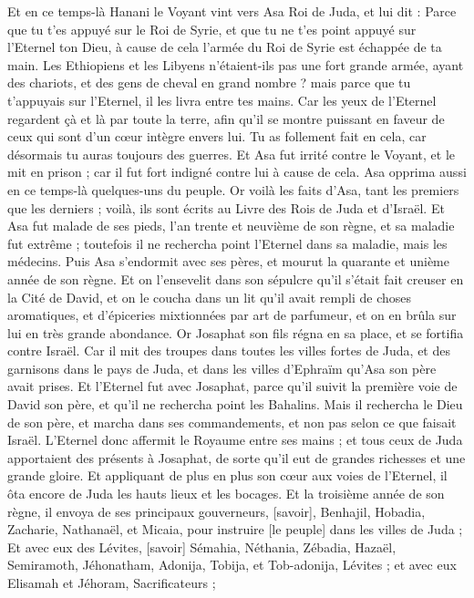 \begin{multicols}{2}
Et en ce temps-là Hanani le Voyant vint vers Asa Roi de Juda, et lui dit : Parce que tu t'es appuyé sur le Roi de Syrie, et que tu ne t'es point appuyé sur l'Eternel ton Dieu, à cause de cela l'armée du Roi de Syrie est échappée de ta main.
Les Ethiopiens et les Libyens n'étaient-ils pas une fort grande armée, ayant des chariots, et des gens de cheval en grand nombre ? mais parce que tu t'appuyais sur l'Eternel, il les livra entre tes mains.
Car les yeux de l'Eternel regardent çà et là par toute la terre, afin qu'il se montre puissant en faveur de ceux qui sont d'un cœur intègre envers lui. Tu as follement fait en cela, car désormais tu auras toujours des guerres.
Et Asa fut irrité contre le Voyant, et le mit en prison ; car il fut fort indigné contre lui à cause de cela. Asa opprima aussi en ce temps-là quelques-uns du peuple.
Or voilà les faits d'Asa, tant les premiers que les derniers ; voilà, ils sont écrits au Livre des Rois de Juda et d'Israël.
Et Asa fut malade de ses pieds, l'an trente et neuvième de son règne, et sa maladie fut extrême ; toutefois il ne rechercha point l'Eternel dans sa maladie, mais les médecins.
Puis Asa s'endormit avec ses pères, et mourut la quarante et unième année de son règne.
Et on l'ensevelit dans son sépulcre qu'il s'était fait creuser en la Cité de David, et on le coucha dans un lit qu'il avait rempli de choses aromatiques, et d'épiceries mixtionnées par art de parfumeur, et on en brûla sur lui en très grande abondance.
\VerseOne{}Or Josaphat son fils régna en sa place, et se fortifia contre Israël.
Car il mit des troupes dans toutes les villes fortes de Juda, et des garnisons dans le pays de Juda, et dans les villes d'Ephraïm qu'Asa son père avait prises.
Et l'Eternel fut avec Josaphat, parce qu'il suivit la première voie de David son père, et qu'il ne rechercha point les Bahalins.
Mais il rechercha le Dieu de son père, et marcha dans ses commandements, et non pas selon ce que faisait Israël.
L'Eternel donc affermit le Royaume entre ses mains ; et tous ceux de Juda apportaient des présents à Josaphat, de sorte qu'il eut de grandes richesses et une grande gloire.
Et appliquant de plus en plus son cœur aux voies de l'Eternel, il ôta encore de Juda les hauts lieux et les bocages.
Et la troisième année de son règne, il envoya de ses principaux gouverneurs, [savoir], Benhajil, Hobadia, Zacharie, Nathanaël, et Micaia, pour instruire [le peuple] dans les villes de Juda ;
Et avec eux des Lévites, [savoir] Sémahia, Néthania, Zébadia, Hazaël, Semiramoth, Jéhonatham, Adonija, Tobija, et Tob-adonija, Lévites ; et avec eux Elisamah et Jéhoram, Sacrificateurs ;

\end{multicols}
